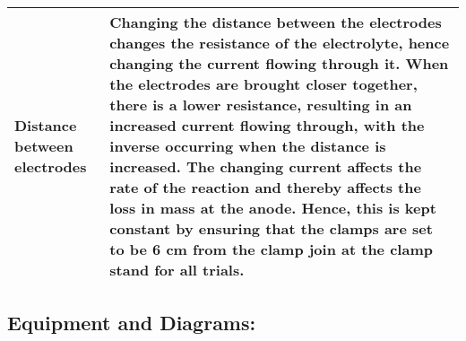 \documentclass[11pt, a4]{article}
\begin{document}
\begin{longtable}{|>{\centering\arraybackslash}m{4.5cm}|>{\centering\arraybackslash}m{10.5cm}|}
				\hline 
				Distance between electrodes & Changing the distance between the electrodes changes the resistance of the electrolyte, hence changing the current flowing through it. When the electrodes are brought closer together, there is a lower resistance, resulting in an increased current flowing through, with the inverse occurring when the distance is increased. The changing current affects the rate of the reaction and thereby affects the loss in mass at the anode. Hence, this is kept constant by ensuring that the clamps are set to be 6 cm from the clamp join at the clamp stand for all trials.\\
				\hline
			\end{longtable}
		
		\subsection{Equipment and Diagrams:}
\end{document}
